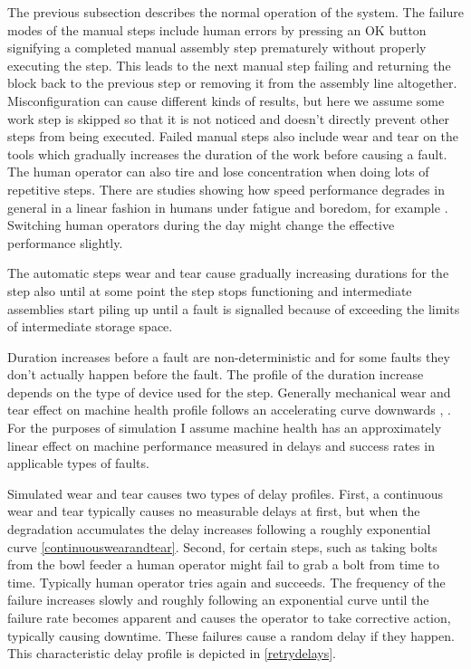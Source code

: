 \documentclass[journal]{IEEEtran}
\begin{document}
The previous subsection describes the normal operation of the system. The failure modes of the manual steps include human errors by pressing an OK button
signifying a completed manual assembly step prematurely without properly executing the step. This leads to the next manual step failing and
returning the block back to the previous step or
removing it from the assembly line altogether. Misconfiguration can cause different kinds of results, but here we assume some work step is skipped
so that it is not noticed and doesn't directly prevent other steps from being executed. Failed manual steps also include wear and tear
on the tools which gradually increases the duration of the work before causing a fault. The human operator can also tire and lose concentration
when doing lots of repetitive steps. There are studies showing how speed performance degrades in general in a linear fashion in humans
under fatigue and boredom, for example \cite{fatigue}. Switching human operators during the day might change the effective performance slightly.

The automatic steps wear and tear cause gradually increasing durations for the step also until at some point the step stops functioning and
intermediate assemblies start piling up until a fault is signalled because of exceeding the limits of intermediate storage space.

Duration increases before a fault are non-deterministic and for some faults they don't actually happen before the fault. The profile of the duration
increase depends on the type of device used for the step. Generally mechanical wear and tear effect on machine health profile follows
an accelerating curve downwards \cite{eker2012major}, \cite{milldataset}. For the purposes of simulation I assume machine health has an approximately
linear effect on machine performance measured in delays and success rates in applicable types of faults.

Simulated wear and tear causes two types of delay profiles. First,
a continuous wear and tear typically causes no measurable delays at first, but when the degradation accumulates the delay increases following
a roughly exponential curve \ref{continuouswearandtear}. Second, for certain steps, such as taking bolts from the bowl feeder a human operator
might fail to grab a bolt from time to time. Typically human operator tries again and succeeds. The frequency of the failure increases
slowly and roughly following an exponential curve until the failure rate becomes apparent and causes the operator to take corrective action,
typically causing downtime. These failures cause a random delay if they happen. This characteristic delay profile is depicted in \ref{retrydelays}.
\end{document}
